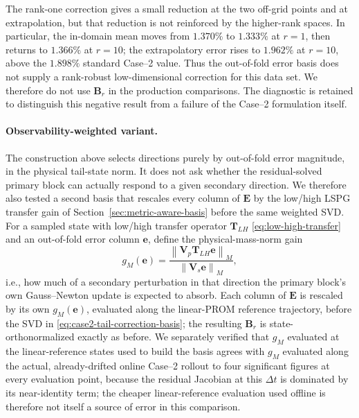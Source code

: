 \documentclass[11pt]{article}
\newcommand{\V}{\mathbf V}
\newcommand{\uvec}{\mathbf u}
\newcommand{\mub}{\bm\mu}
\newcommand{\norm}[1]{\left\lVert #1 \right\rVert}
\begin{document}
\begin{table}[H]
\centering
\caption{Low-rank secondary-tail correction diagnostic for baseline
Case--2.  Entries are online state errors
\(100\lVert\uvec_{\mathrm{HDM}}-\uvec_{\mathrm{ROM}}\rVert_F/
\lVert\uvec_{\mathrm{HDM}}\rVert_F\).  The mean averages
\(\mub^{(v)},\mub^{(1)},\mub^{(2)}\).  The \(r\) correction coordinates are
in addition to the ten standard primary coordinates.}
\label{tab:case2-tail-correction}

\end{table}

The rank-one correction gives a small reduction at the two off-grid points and
at extrapolation, but that reduction is not reinforced by the higher-rank
spaces.  In particular, the in-domain mean moves from \(1.370\%\) to
\(1.333\%\) at \(r=1\), then returns to \(1.366\%\) at \(r=10\); the
extrapolatory error rises to
\(1.962\%\) at \(r=10\), above the \(1.898\%\) standard Case--2 value.
Thus the out-of-fold error basis does not supply a rank-robust low-dimensional
correction for this data set.  We therefore do not use \(\mathbf B_r\) in the
production comparisons.  The diagnostic is retained to distinguish this
negative result from a failure of the Case--2 formulation itself.

\paragraph{Observability-weighted variant.}
The construction above selects directions purely by out-of-fold error
magnitude, in the physical tail-state norm.  It does not ask whether the
residual-solved primary block can actually respond to a given secondary
direction.  We therefore also tested a second basis that rescales every
column of \(\mathbf E\) by the low/high LSPG transfer gain of
Section~\ref{sec:metric-aware-basis} before the same weighted SVD.  For a
sampled state with low/high transfer operator \(\mathbf T_{LH}\)
\eqref{eq:low-high-transfer} and an out-of-fold error column \(\mathbf e\),
define the physical-mass-norm gain
\begin{equation}
  g_M(\mathbf e)
  =\frac{\norm{\V_p\mathbf T_{LH}\mathbf e}_M}{\norm{\V_s\mathbf e}_M},
  \label{eq:case2-tail-correction-gain}
\end{equation}
i.e., how much of a secondary perturbation in that direction the primary
block's own Gauss--Newton update is expected to absorb.  Each column of
\(\mathbf E\) is rescaled by its own \(g_M(\mathbf e)\), evaluated along the
linear-PROM reference trajectory, before the SVD in
\eqref{eq:case2-tail-correction-basis}; the resulting \(\mathbf B_r\) is
state-orthonormalized exactly as before.  We separately verified that
\(g_M\) evaluated at the linear-reference states used to build the basis
agrees with \(g_M\) evaluated along the actual, already-drifted online
Case--2 rollout to four significant figures at every evaluation point,
because the residual Jacobian at this \(\Delta t\) is dominated by its
near-identity term; the cheaper linear-reference evaluation used offline is
therefore not itself a source of error in this comparison.
\end{document}
